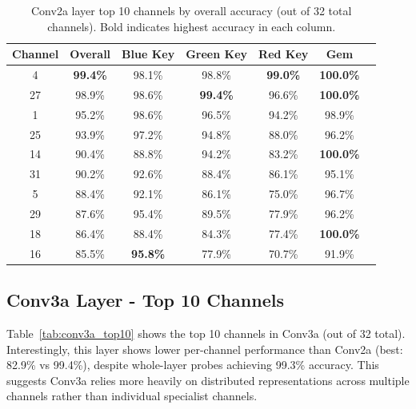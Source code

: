 \documentclass[12pt,a4paper]{report}
\begin{document}
\begin{table}[H]
\centering
\caption[Conv2a top 10 channel probe accuracies]{Conv2a layer top 10 channels by overall accuracy (out of 32 total channels). Bold indicates highest accuracy in each column.}
\label{tab:conv2a_top10}
\begin{tabular}{ccccccc}
\toprule
Channel & Overall & Blue Key & Green Key & Red Key & Gem \\
\midrule
4 & \textbf{99.4\%} & 98.1\% & 98.8\% & \textbf{99.0\%} & \textbf{100.0\%} \\
27 & 98.9\% & 98.6\% & \textbf{99.4\%} & 96.6\% & \textbf{100.0\%} \\
1 & 95.2\% & 98.6\% & 96.5\% & 94.2\% & 98.9\% \\
25 & 93.9\% & 97.2\% & 94.8\% & 88.0\% & 96.2\% \\
14 & 90.4\% & 88.8\% & 94.2\% & 83.2\% & \textbf{100.0\%} \\
31 & 90.2\% & 92.6\% & 88.4\% & 86.1\% & 95.1\% \\
5 & 88.4\% & 92.1\% & 86.1\% & 75.0\% & 96.7\% \\
29 & 87.6\% & 95.4\% & 89.5\% & 77.9\% & 96.2\% \\
18 & 86.4\% & 88.4\% & 84.3\% & 77.4\% & \textbf{100.0\%} \\
16 & 85.5\% & \textbf{95.8\%} & 77.9\% & 70.7\% & 91.9\% \\
\bottomrule
\end{tabular}
\end{table}

\subsection{Conv3a Layer - Top 10 Channels}

Table~\ref{tab:conv3a_top10} shows the top 10 channels in Conv3a (out of 32 total). Interestingly, this layer shows lower per-channel performance than Conv2a (best: 82.9\% vs 99.4\%), despite whole-layer probes achieving 99.3\% accuracy. This suggests Conv3a relies more heavily on distributed representations across multiple channels rather than individual specialist channels.
\end{document}
